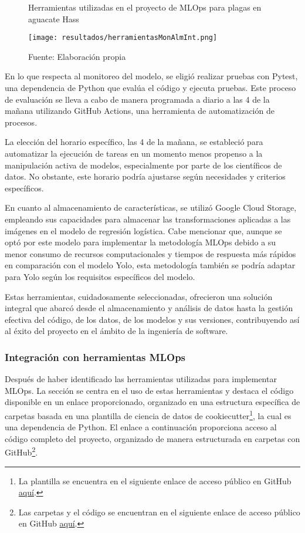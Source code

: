 \begin{figure}[h]
\centering
\caption{Herramientas utilizadas en el proyecto de MLOps para plagas en aguacate Hass}
\texttt{[image: resultados/herramientasMonAlmInt.png]}
\caption*{\footnotesize Fuente: Elaboración propia}
\label{fig:figuraHerramientasMonAlmInt}
\end{figure}

En lo que respecta al monitoreo del modelo, se eligió realizar pruebas con Pytest, una dependencia de Python que evalúa el código y ejecuta pruebas. Este proceso de evaluación se lleva a cabo de manera programada a diario a las 4 de la mañana utilizando GitHub Actions, una herramienta de automatización de procesos. \newline

La elección del horario específico, las 4 de la mañana, se estableció para automatizar la ejecución de tareas en un momento menos propenso a la manipulación activa de modelos, especialmente por parte de los científicos de datos. No obstante, este horario podría ajustarse según necesidades y criterios específicos. \newline

En cuanto al almacenamiento de características, se utilizó Google Cloud Storage, empleando sus capacidades para almacenar las transformaciones aplicadas a las imágenes en el modelo de regresión logística. Cabe mencionar que, aunque se optó por este modelo para implementar la metodología MLOps debido a su menor consumo de recursos computacionales y tiempos de respuesta más rápidos en comparación con el modelo Yolo, esta metodología también se podría adaptar para Yolo según los requisitos específicos del modelo. \newline

Estas herramientas, cuidadosamente seleccionadas, ofrecieron una solución integral que abarcó desde el almacenamiento y análisis de datos hasta la gestión efectiva del código, de los datos, de los modelos y sus versiones, contribuyendo así al éxito del proyecto en el ámbito de la ingeniería de software.

\newpage

\subsubsection{Integración con herramientas MLOps}

Después de haber identificado las herramientas utilizadas para implementar MLOps. La sección se centra en el uso de estas herramientas y destaca el código disponible en un enlace proporcionado, organizado en una estructura específica de carpetas basada en una plantilla de ciencia de datos de cookiecutter\footnote{La plantilla se encuentra en el siguiente enlace de acceso público en GitHub \href{https://github.com/khuyentran1401/data-science-template/tree/dvc-pip}{aquí}.}, la cual es una dependencia de Python. El enlace a continuación proporciona acceso al código completo del proyecto, organizado de manera estructurada en carpetas con GitHub\footnote{Las carpetas y el código se encuentran en el siguiente enlace de acceso público en GitHub \href{https://github.com/juferoto/mlops_project}{aquí}.}.


